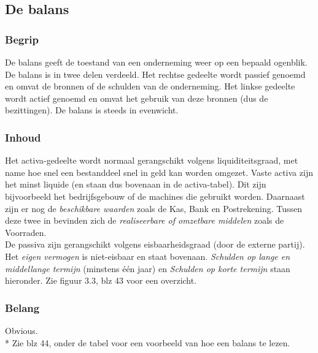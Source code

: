\documentclass[12pt]{article}
\begin{document}
\subsection{De balans}
\subsubsection{Begrip}
De balans geeft de toestand van een onderneming weer op een bepaald ogenblik. De balans is in twee delen verdeeld. Het rechtse gedeelte wordt passief genoemd en omvat de bronnen of de schulden van de onderneming. Het linkse gedeelte wordt actief genoemd en omvat het gebruik van deze bronnen (dus de bezittingen). De balans is steeds in evenwicht.
\subsubsection{Inhoud}
Het activa-gedeelte wordt normaal gerangschikt volgens liquiditeitsgraad, met name hoe snel een bestanddeel snel in geld kan worden omgezet. Vaste activa zijn het minst liquide (en staan dus bovenaan in de activa-tabel). Dit zijn bijvoorbeeld het bedrijfsgebouw of de machines die gebruikt worden. Daarnaast zijn er nog de \textit{beschikbare waarden} zoals de Kas, Bank en Postrekening. Tussen deze twee in bevinden zich de \textit{realiseerbare of omzetbare middelen} zoals de Voorraden.\\
De passiva zijn gerangschikt volgens eisbaarheidsgraad (door de externe partij). Het \textit{eigen vermogen} is niet-eisbaar en staat bovenaan. \textit{Schulden op lange en middellange termijn} (minstens \'e\'en jaar) en \textit{Schulden op korte termijn} staan hieronder. Zie figuur 3.3, blz 43 voor een overzicht.
\subsubsection{Belang}
Obvious.\\*
Zie blz 44, onder de tabel voor een voorbeeld van hoe een balans te lezen.
\end{document}
